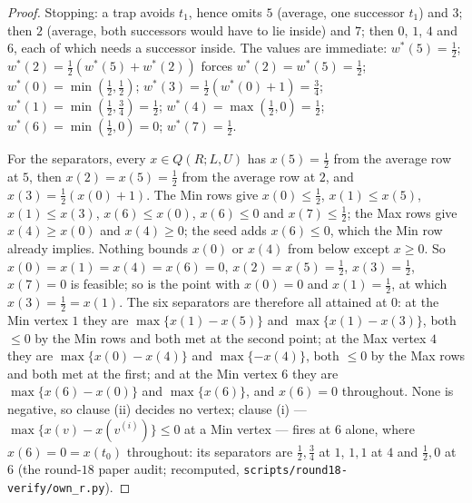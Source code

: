 \documentclass[11pt]{article}
\theoremstyle{plain}
\theoremstyle{definition}
\begin{document}
\begin{proof}
Stopping: a trap avoids $t_1$, hence omits $5$ (average, one successor $t_1$)
and $3$; then $2$ (average, both successors would have to lie inside) and $7$;
then $0$, $1$, $4$ and $6$, each of which needs a successor inside. The values
are immediate: $w^\ast(5)=\tfrac12$; $w^\ast(2)=\tfrac12(w^\ast(5)+w^\ast(2))$
forces $w^\ast(2)=w^\ast(5)=\tfrac12$; $w^\ast(0)=\min(\tfrac12,\tfrac12)$;
$w^\ast(3)=\tfrac12(w^\ast(0)+1)=\tfrac34$;
$w^\ast(1)=\min(\tfrac12,\tfrac34)=\tfrac12$;
$w^\ast(4)=\max(\tfrac12,0)=\tfrac12$; $w^\ast(6)=\min(\tfrac12,0)=0$;
$w^\ast(7)=\tfrac12$.

For the separators, every $x\in Q(R;L,U)$ has $x(5)=\tfrac12$ from the average
row at $5$, then $x(2)=x(5)=\tfrac12$ from the average row at $2$, and
$x(3)=\tfrac12(x(0)+1)$. The Min rows give $x(0)\le\tfrac12$, $x(1)\le x(5)$,
$x(1)\le x(3)$, $x(6)\le x(0)$, $x(6)\le0$ and $x(7)\le\tfrac12$; the Max rows
give $x(4)\ge x(0)$ and $x(4)\ge0$; the seed adds $x(6)\le0$, which the Min row
already implies. Nothing bounds $x(0)$ or $x(4)$ from below except $x\ge0$. So
$x(0)=x(1)=x(4)=x(6)=0$, $x(2)=x(5)=\tfrac12$, $x(3)=\tfrac12$, $x(7)=0$ is
feasible; so is the point with $x(0)=0$ and $x(1)=\tfrac12$, at which
$x(3)=\tfrac12=x(1)$. The six separators are therefore all attained at $0$: at
the Min vertex $1$ they are $\max\{x(1)-x(5)\}$ and $\max\{x(1)-x(3)\}$, both
$\le0$ by the Min rows and both met at the second point; at the Max vertex $4$
they are $\max\{x(0)-x(4)\}$ and $\max\{-x(4)\}$, both $\le0$ by the Max rows
and both met at the first; and at the Min vertex $6$ they are
$\max\{x(6)-x(0)\}$ and $\max\{x(6)\}$, and $x(6)=0$ throughout. None is
negative, so clause (ii) decides no vertex; clause (i) ---
$\max\{x(v)-x(v^{(i)})\}\le0$ at a Min vertex --- fires at $6$ alone, where
$x(6)=0=x(t_0)$ throughout: its separators are $\tfrac12,\tfrac34$ at $1$,
$1,1$ at $4$ and $\tfrac12,0$ at $6$ (the round-$18$ paper audit; recomputed,
\texttt{scripts/round18-verify/own\_r.py}).
\end{proof}
\end{document}

